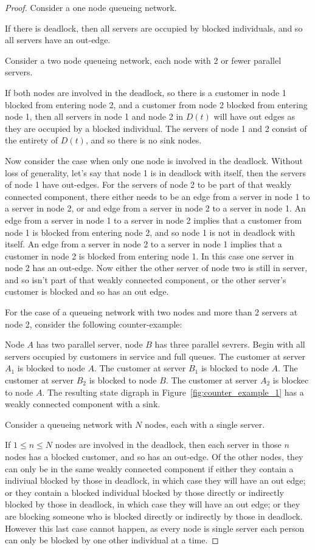 \documentclass{article}
\begin{document}
\begin{proof}
Consider a one node queueing network.

If there is deadlock, then all servers are occupied by blocked individuals, and so all servers have an out-edge.

Consider a two node queueing network, each node with 2 or fewer parallel servers.

If both nodes are involved in the deadlock, so there is a customer in node 1 blocked from entering node 2, and a customer from node 2 blocked from entering node 1, then all servers in node 1 and node 2 in $D(t)$ will have out edges as they are occupied by a blocked individual.
The servers of node 1 and 2 consist of the entirety of $D(t)$, and so there is no sink nodes.

Now consider the case when only one node is involved in the deadlock.
Without loss of generality, let's say that node 1 is in deadlock with itself, then the servers of node 1 have out-edges.
For the servers of node 2 to be part of that weakly connected component, there either needs to be an edge from a server in node 1 to a server in node 2, or and edge from a server in node 2 to a server in node 1.
An edge from a server in node 1 to a server in node 2 implies that a customer from node 1 is blocked from entering node 2, and so node 1 is not in deadlock with itself.
An edge from a server in node 2 to a server in node 1 implies that a customer in node 2 is blocked from entering node 1.
In this case one server in node 2 has an out-edge.
Now either the other server of node two is still in server, and so isn't part of that weakly connected component, or the other server's customer is blocked and so has an out edge.

For the case of a queueing network with two nodes and more than 2 servers at node 2, consider the following counter-example:

Node $A$ has two parallel server, node $B$ has three parallel sevrers.
Begin with all servers occupied by customers in service and full queues.
The customer at server $A_1$ is blocked to node $A$.
The customer at server $B_1$ is blocked to node $A$.
The customer at server $B_2$ is blocked to node $B$.
The customer at server $A_2$ is blockec to node $A$.
The resulting state digraph in Figure~\ref{fig:counter_example_1} has a weakly connected component with a sink.

Consider a queueing network with $N$ nodes, each with a single server.

If $1 \leq n \leq N$ nodes are involved in the deadlock, then each server in those $n$ nodes has a blocked customer, and so has an out-edge.
Of the other nodes, they can only be in the same weakly connected component if either they contain a indiviual blocked by those in deadlock, in which case they will have an out edge; or they contain a blocked individual blocked by those directly or indirectly blocked by those in deadlock, in which case they will have an out edge; or they are blocking someone who is blocked directly or indirectly by those in deadlock.
However this last case cannot happen, as every node is single server each person can only be blocked by one other individual at a time.


\end{proof}
\end{document}
